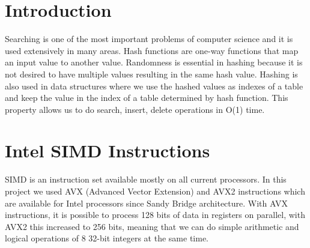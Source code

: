 \documentclass[a0,portrait]{a0poster}
\begin{document}
\begin{minipage}[c]{\linewidth}
\begin{framed}
\begin{multicols}{2}
\section*{Introduction}
Searching is one of the most important problems of computer science and it is used extensively in many areas. Hash functions are one-way functions that map an input value to another value. Randomness is essential in hashing because it is not desired to have multiple values resulting in the same hash value. Hashing is also used in  data structures where we use the hashed values as indexes of a table  and keep the value in the index of a table determined by hash function. This property allows us to do search, insert, delete operations in O(1) time. \cite{NIPS2017_7239}
\color{Black}
\section{Intel SIMD Instructions}
SIMD is an instruction set available mostly on all current processors. In this project we used AVX (Advanced Vector Extension) and AVX2 instructions which are available for Intel processors since Sandy Bridge architecture. With AVX instructions, it is possible to process 128 bits of data in registers on parallel, with AVX2 this increased to 256 bits, meaning that we can do simple arithmetic and logical operations of 8 32-bit integers at the same time.\cite{Wang:2014:SPF:2568058.2568059}

\color{Black}





\end{multicols}
\end{framed}
\end{minipage}
\end{document}
